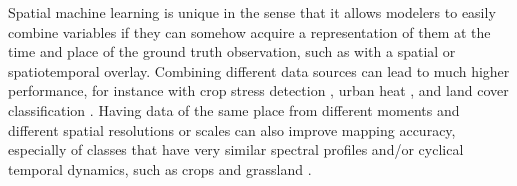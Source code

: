         Spatial machine learning is unique in the sense that it allows modelers to easily combine variables if they can somehow acquire a representation of them at the time and place of the ground truth observation, such as with a spatial or spatiotemporal overlay. Combining different data sources can lead to much higher performance, for instance with crop stress detection  \citep{berger2022multi}, urban heat \citep{shahi2015novel}, and land cover classification \citep{zhu2016optimizing, hurskainen2019auxiliary, hosseiny2022urban}. Having data of the same place from different moments \citep{low2013impact} and different spatial resolutions or scales \citep{santos2012multiscale} can also improve mapping accuracy, especially of classes that have very similar spectral profiles and/or cyclical temporal dynamics, such as crops and grassland \citep{esch2014differentiation}.






